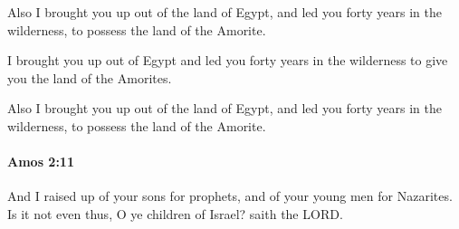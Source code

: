 			\begin{versebox}
					\item[BHS] 
					\item[LXX] 
					\item[ASV] Also I brought you up out of the land of Egypt, and led you forty years in the wilderness, to possess the land of the Amorite.
					\item[NIV] I brought you up out of Egypt and led you forty years in the wilderness to give you the land of the Amorites.
					\item[NRSV] Also I brought you up out of the land of Egypt, and led you forty years in the wilderness, to possess the land of the Amorite.
			\end{versebox}

		\paragraph{Amos 2:11} %
			\label{AMOS-2-11}

			And I raised up of your sons for prophets, and of your young men for Nazarites. Is it not even thus, O ye children of Israel? saith the LORD.

